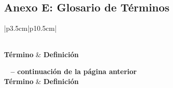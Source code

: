 \subsection{Anexo E: Glosario de Términos}

\begin{longtable}{|p{3.5cm}|p{10.5cm}|}
\caption{Glosario de Términos Técnicos} \\
\hline
\textbf{Término} & \textbf{Definición} \\ \hline
\endfirsthead

%
{{\bfseries \tablename\ \thetable{} -- continuación de la página anterior}} \\
\hline
\textbf{Término} & \textbf{Definición} \\ \hline
\endhead

\hline {} \\ \hline
\endfoot


\end{longtable}
